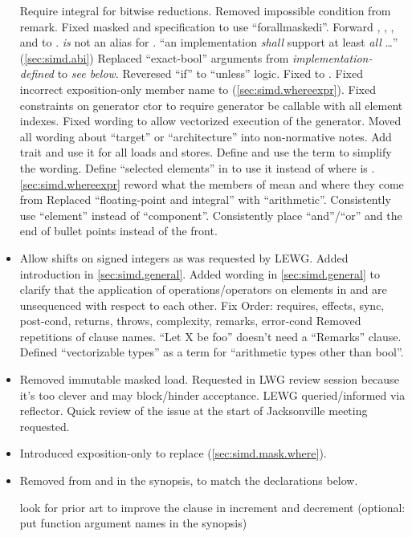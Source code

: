 \begin{itemize}
  \chck Require integral  for bitwise reductions.
  \chck Removed impossible condition from  remark.
  \chck Fixed masked  and  specification to use “forallmaskedi”.
  \chck Forward , , , and  to .
  \chck {} \emph{is} not an alias for .
  \chck “an implementation \emph{shall} support at least \emph{all} \ldots” (\ref{sec:simd.abi})
  \chck Replaced “exact-bool” arguments from \emph{implementation-defined} to \emph{see below}.
  \chck Reveresed “if” to “unless” logic.
  \chck Fixed  to .
  \chck Fixed incorrect  exposition-only member name to  (\ref{sec:simd.whereexpr}).
  \chck Fixed constraints on generator ctor to require generator be callable with all element indexes.
  \chck Fixed wording to allow vectorized execution of the generator.
  \chck Moved all wording about “target” or “architecture” into non-normative notes.
  \chck Add  trait and use it for all loads and stores.
  \chck Define and use the term \emph{\realArithmeticType} to simplify the wording.
  \chck Define “selected elements” in  to use it instead of  where  is \true.
  \chck \ref{sec:simd.whereexpr} reword what the members of  mean and where they come from
  \chck Replaced “floating-point and integral” with “arithmetic”.
  \chck Consistently use “element” instead of “component”.
  \chck Consistently place “and”/“or” and the end of bullet points instead of the front.
  \item Allow shifts on signed integers as was requested by LEWG.
  \chck Added introduction in \ref{sec:simd.general}.
  \chck Added wording in \ref{sec:simd.general} to clarify that the application of operations/operators on elements in \simd and \mask are unsequenced with respect to each other.
  \chck Fix Order: requires, effects, sync, post-cond, returns, throws, complexity, remarks, error-cond
  \chck Removed repetitions of clause names.
  \chck “Let X be foo” doesn't need a “Remarks” clause.
  \chck Defined “vectorizable types” as a term for “arithmetic types other than bool”.
  \item Removed immutable masked load.
    Requested in LWG review session because it's too clever and may block/hinder acceptance.
    LEWG queried/informed via reflector.
    Quick review of the issue at the start of Jacksonville meeting requested.
  \item Introduced exposition-only  to replace  (\ref{sec:simd.mask.where}).
  \item Removed  from  and  in the synopsis, to match the declarations below.

  \todo look for prior art to improve the \returns clause in increment and decrement
  \todo (optional: put function argument names in the synopsis)
\end{itemize}

